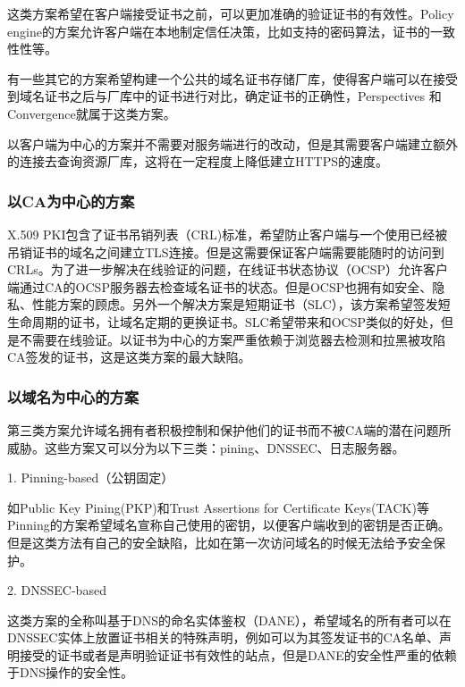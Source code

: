 这类方案希望在客户端接受证书之前，可以更加准确的验证证书的有效性。Policy engine\cite{abadi2013global}的方案允许客户端在本地制定信任决策，比如支持的密码算法，证书的一致性性等。

有一些其它的方案希望构建一个公共的域名证书存储厂库，使得客户端可以在接受到域名证书之后与厂库中的证书进行对比，确定证书的正确性，Perspectives\cite{wendlandt2008perspectives} 和 Convergence\cite{convergence}就属于这类方案。

以客户端为中心的方案并不需要对服务端进行的改动，但是其需要客户端建立额外的连接去查询资源厂库，这将在一定程度上降低建立HTTPS的速度。


\subsubsection{以CA为中心的方案}

X.509 PKI包含了证书吊销列表（CRL)标准\cite{cooper2008internet}，希望防止客户端与一个使用已经被吊销证书的域名之间建立TLS连接。但是这需要保证客户端需要能随时的访问到CRLs。为了进一步解决在线验证的问题，在线证书状态协议（OCSP）\cite{myers1999x}允许客户端通过CA的OCSP服务器去检查域名证书的状态。但是OCSP也拥有如安全、隐私、性能方案的顾虑。另外一个解决方案是短期证书（SLC）\cite{topalovic2012towards}，该方案希望签发短生命周期的证书，让域名定期的更换证书。SLC希望带来和OCSP类似的好处，但是不需要在线验证。以证书为中心的方案严重依赖于浏览器去检测和拉黑被攻陷CA签发的证书，这是这类方案的最大缺陷。


\subsubsection{以域名为中心的方案}


第三类方案允许域名拥有者积极控制和保护他们的证书而不被CA端的潜在问题所威胁。这些方案又可以分为以下三类：pining、DNSSEC、日志服务器。

1. Pinning-based（公钥固定）

如Public Key Pining(PKP)\cite{evans2015public}和Trust Assertions for Certificate Keys(TACK)\cite{marlinspike2012internet}等Pinning的方案希望域名宣称自己使用的密钥，以便客户端收到的密钥是否正确。但是这类方法有自己的安全缺陷，比如在第一次访问域名的时候无法给予安全保护。

2. DNSSEC-based

这类方案的全称叫基于DNS的命名实体鉴权（DANE）\cite{barnes2011dane}，希望域名的所有者可以在DNSSEC实体上放置证书相关的特殊声明，例如可以为其签发证书的CA名单、声明接受的证书或者是声明验证证书有效性的站点，但是DANE的安全性严重的依赖于DNS操作的安全性。


